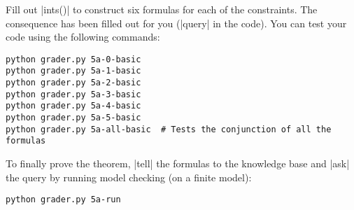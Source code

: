 \item {}
Fill out |ints()| to construct six formulas for each of the constraints.  The
consequence has been filled out for you (|query| in the code). You can test your
code using the following commands:
\begin{lstlisting}
python grader.py 5a-0-basic
python grader.py 5a-1-basic
python grader.py 5a-2-basic
python grader.py 5a-3-basic
python grader.py 5a-4-basic
python grader.py 5a-5-basic
python grader.py 5a-all-basic  # Tests the conjunction of all the formulas
\end{lstlisting}

To finally prove the theorem, |tell| the formulas to the knowledge base and
|ask| the query by running model checking (on a finite model):
\begin{lstlisting}
python grader.py 5a-run
\end{lstlisting}
